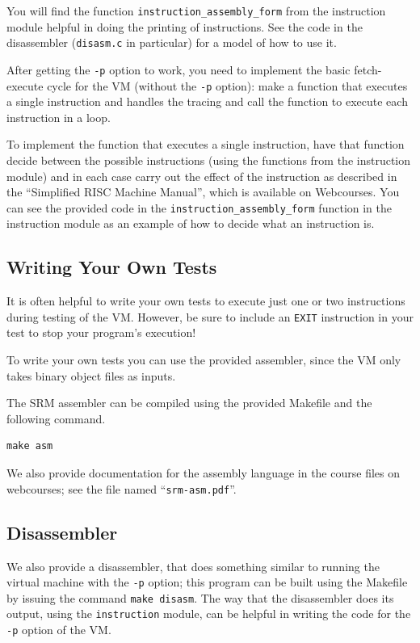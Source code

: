 \documentclass[11pt,letterpaper]{article}
\begin{document}
You will find the function \lstinline!instruction_assembly_form!
from the instruction module
helpful in doing the printing of instructions. See the code in the
disassembler (\texttt{disasm.c} in particular) for a model of how to
use it.

After getting the \texttt{-p} option to work,
you need to implement the basic fetch-execute cycle for the VM
(without the \texttt{-p} option):
make a function that executes a single instruction and handles the tracing
and call the function to execute each instruction in a loop.

To implement the function that executes a single instruction,
have that function decide between the possible instructions
(using the functions from the instruction module) and
in each case carry out the effect of the instruction as described in
the ``Simplified RISC Machine Manual'', which is available on
Webcourses.
You can see the provided code in the
\lstinline!instruction_assembly_form!
function in the instruction module as an example of how to
decide what an instruction is.

\subsection{Writing Your Own Tests}

It is often helpful to write your own tests to execute just one or two
instructions during testing of the VM.
However, be sure to include an \texttt{EXIT} instruction in your test to
stop your program's execution!

To write your own tests you can use the provided assembler,
since the VM only takes binary object files as inputs.

The SRM assembler can be compiled using the provided Makefile and the
following command.
\begin{lstlisting}
make asm
\end{lstlisting}

We also provide documentation for the
assembly language in the course files on webcourses; see the file
named ``\texttt{srm-asm.pdf}''.

\subsection{Disassembler}

We also provide a disassembler, that does something similar to running the
virtual machine with the \texttt{-p} option; this program can be built
using the Makefile by issuing the command \texttt{make disasm}.
The way that the disassembler does its output, using the
\texttt{instruction} module, can be helpful in writing the code for
the \texttt{-p} option of the VM.
\end{document}
